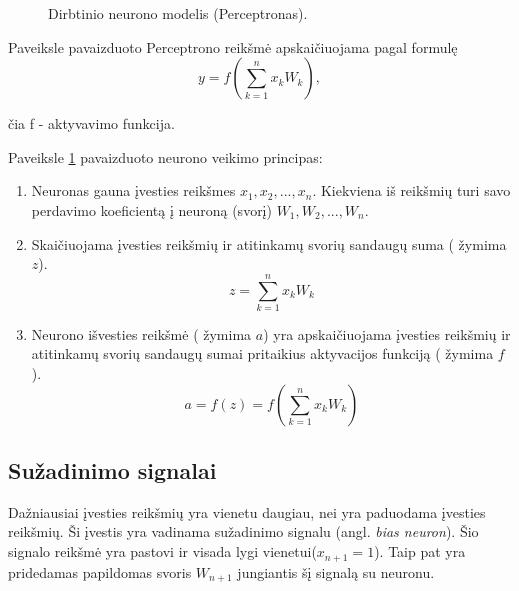 \begin{figure}
  \centering
{}
\caption{Dirbtinio neurono modelis (Perceptronas).}
\label{fig:perceptron}
\end{figure}

Paveiksle pavaizduoto Perceptrono reikšmė apskaičiuojama pagal formulę
\begin{equation*}
  y = f \left(\sum_{k=1}^{n} x_k W_k \right),
\end{equation*}

čia f - aktyvavimo funkcija.

Paveiksle \ref{fig:perceptron} pavaizduoto neurono veikimo principas:
\begin{enumerate}

\item Neuronas gauna įvesties reikšmes $x_1, x_2, ... , x_n$. Kiekviena iš reikšmių turi savo perdavimo koeficientą į neuroną (svorį) $W_1, W_2, ... , W_n$.
\item  Skaičiuojama įvesties reikšmių ir atitinkamų svorių sandaugų suma ( žymima $z$).
\begin{equation*}
  z = \sum_{k=1}^{n} x_k W_k
\end{equation*}

\item  Neurono išvesties reikšmė ( žymima $a$) yra apskaičiuojama įvesties reikšmių ir atitinkamų svorių sandaugų sumai pritaikius aktyvacijos funkciją ( žymima $f$).
\begin{equation*}
  a = f(z) = f(\sum_{k=1}^{n} x_k W_k)
\end{equation*}
\end{enumerate}

\subsection{Sužadinimo signalai}
Dažniausiai įvesties reikšmių yra vienetu daugiau, nei yra paduodama įvesties reikšmių. Ši įvestis yra vadinama sužadinimo signalu (angl. \textit{bias neuron}). Šio signalo reikšmė yra pastovi ir visada lygi vienetui($x_{n+1} = 1$). Taip pat yra pridedamas papildomas svoris $W_{n+1}$ jungiantis šį signalą su neuronu.\cite{Ieva2012}

